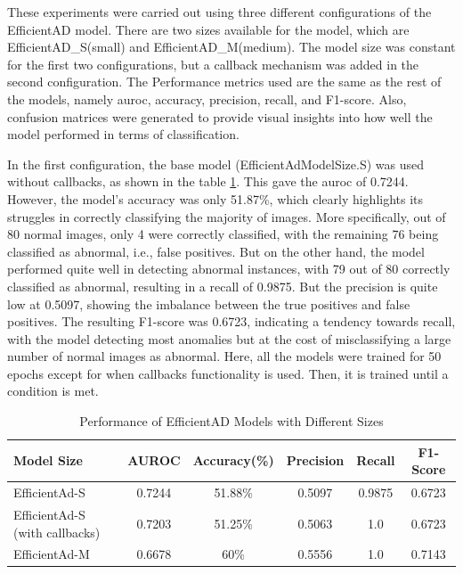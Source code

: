 These experiments were carried out using three different configurations of the EfficientAD model. There are two sizes available for the model, which are EfficientAD\_S(small) and EfficientAD\_M(medium). The model size was constant for the first two configurations, but a callback mechanism was added in the second configuration. The Performance metrics used are the same as the rest of the models, namely \gls{auroc}, accuracy, precision, recall, and F1-score. Also, confusion matrices were generated to provide visual insights into how well the model performed in terms of classification.

In the first configuration, the base model (EfficientAdModelSize.S) was used without callbacks, as shown in the table \ref{tab:efficientad results}. This gave the \gls{auroc} of 0.7244. However, the model's accuracy was only 51.87\%, which clearly highlights its struggles in correctly classifying the majority of images. More specifically, out of 80 normal images, only 4 were correctly classified, with the remaining 76 being classified as abnormal, i.e., false positives. But on the other hand, the model performed quite well in detecting abnormal instances, with 79 out of 80 correctly classified as abnormal, resulting in a recall of 0.9875. But the precision is quite low at 0.5097, showing the imbalance between the true positives and false positives. The resulting F1-score was 0.6723, indicating a tendency towards recall, with the model detecting most anomalies but at the cost of misclassifying a large number of normal images as abnormal. Here, all the models were trained for 50 epochs except for when callbacks functionality is used. Then, it is trained until a condition is met.

\begin{table}[ht!]
    \centering
    \begin{tabular}{|l|c|c|c|c|c|}
        \hline
        \textbf{Model Size} & \textbf{AUROC} & \textbf{Accuracy(\%)} & \textbf{Precision} & \textbf{Recall} & \textbf{F1-Score} \\ \hline
        EfficientAd-S & 0.7244 & 51.88\% & 0.5097 & 0.9875 & 0.6723 \\ \hline
        EfficientAd-S (with callbacks) & 0.7203 & 51.25\% & 0.5063 & 1.0 & 0.6723 \\ \hline
        EfficientAd-M & 0.6678 & 60\% & 0.5556 & 1.0 & 0.7143 \\ \hline
    \end{tabular}
    \caption{Performance of EfficientAD Models with Different Sizes}
    \label{tab:efficientad results}
\end{table}

